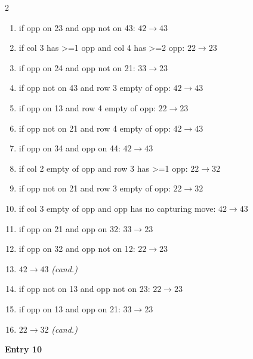 \begin{multicols}{2}
\begin{tikzpicture}[scale=0.24]
\end{tikzpicture}
\nopagebreak\begin{enumerate}[topsep=1pt,itemsep=0pt,parsep=0pt,leftmargin=2.2em,label=\arabic*.]
\item if opp on 23 and opp not on 43: $42\!\to\!43$
\item if col 3 has >=1 opp and col 4 has >=2 opp: $22\!\to\!23$
\item if opp on 24 and opp not on 21: $33\!\to\!23$
\item if opp not on 43 and row 3 empty of opp: $42\!\to\!43$
\item if opp on 13 and row 4 empty of opp: $22\!\to\!23$
\item if opp not on 21 and row 4 empty of opp: $42\!\to\!43$
\item if opp on 34 and opp on 44: $42\!\to\!43$
\item if col 2 empty of opp and row 3 has >=1 opp: $22\!\to\!32$
\item if opp not on 21 and row 3 empty of opp: $22\!\to\!32$
\item if col 3 empty of opp and opp has no capturing move: $42\!\to\!43$
\item if opp on 21 and opp on 32: $33\!\to\!23$
\item if opp on 32 and opp not on 12: $22\!\to\!23$
\item $42\!\to\!43$ \hfill\textit{(cand.)}
\item if opp not on 13 and opp not on 23: $22\!\to\!23$
\item if opp on 13 and opp on 21: $33\!\to\!23$
\item $22\!\to\!32$ \hfill\textit{(cand.)}
\end{enumerate}\smallskip
\noindent\textbf{Entry 10} \; 
\end{multicols}
